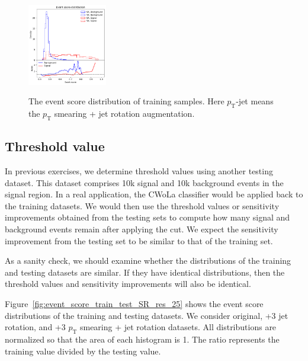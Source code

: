 \documentclass[12pt]{article}
\begin{document}
\begin{figure}[htpb]
{                \includegraphics[width=0.31\textwidth]{HVmodel_event_score_pt_jet_aug_3_train_SR_SB_SB_7_res_25.pdf}
            } 
            \caption{The event score distribution of training samples. Here $p_{\text{T}}$-jet means the $p_{\text{T}}$ smearing + jet rotation augmentation.}
            \label{fig:event_score_train_SR_SB_res_25}
        \end{figure}
    \subsection{Threshold value}%
    \label{sub:threshold_value}
        In previous exercises, we determine threshold values using another testing dataset. This dataset comprises 10k signal and 10k background events in the signal region. In a real application, the CWoLa classifier would be applied back to the training datasets. We would then use the threshold values or sensitivity improvements obtained from the testing sets to compute how many signal and background events remain after applying the cut. We expect the sensitivity improvement from the testing set to be similar to that of the training set. 

        As a sanity check, we should examine whether the distributions of the training and testing datasets are similar. If they have identical distributions, then the threshold values and sensitivity improvements will also be identical.

        Figure~\ref{fig:event_score_train_test_SR_res_25} shows the event score distributions of the training and testing datasets. We consider original, +3 jet rotation, and +3 $p_{\text{T}}$ smearing + jet rotation datasets. All distributions are normalized so that the area of each histogram is 1. The ratio represents the training value divided by the testing value.
\end{document}
